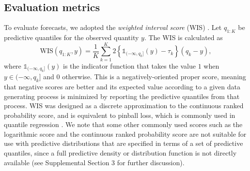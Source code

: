 \documentclass[11pt,3p,authoryear]{elsarticle}
\def\WIS{\mathrm{WIS}}
\begin{document}
\subsection{Evaluation metrics}
\label{subsec:methods_evaluation}

To evaluate forecasts, we adopted the \emph{weighted interval score} (WIS) \citep{bracherEvaluatingEpidemicForecasts2021}.
Let $q_{1:K}$ be predictive quantiles for the observed quantity $y$.
The WIS is calculated as
$$\WIS(q_{1:K},y) = \frac{1}{K} \sum_{k=1}^K 2 \left\{ \mathds{1}_{(-\infty, q_k]}(y) - \tau_k \right\} (q_k - y),$$
where $\mathds{1}_{(-\infty, q_k]}(y)$ is the indicator function that takes the value $1$ when $y \in (-\infty, q_k]$ and $0$ otherwise.
This is a negatively-oriented proper score, meaning that negative scores are better and its expected value according to a given data generating process is minimized by reporting the predictive quantiles from that process. WIS was designed as a discrete approximation to the continuous ranked probability score, and is equivalent to pinball loss, which is commonly used in quantile regression \citep{bracherEvaluatingEpidemicForecasts2021}. We note that some other commonly used scores such as the logarithmic score and the continuous ranked probability score are not suitable for use with predictive distributions that are specified in terms of a set of predictive quantiles, since a full predictive density or distribution function is not directly available (see Supplemental Section 3 for further discussion).
\end{document}
